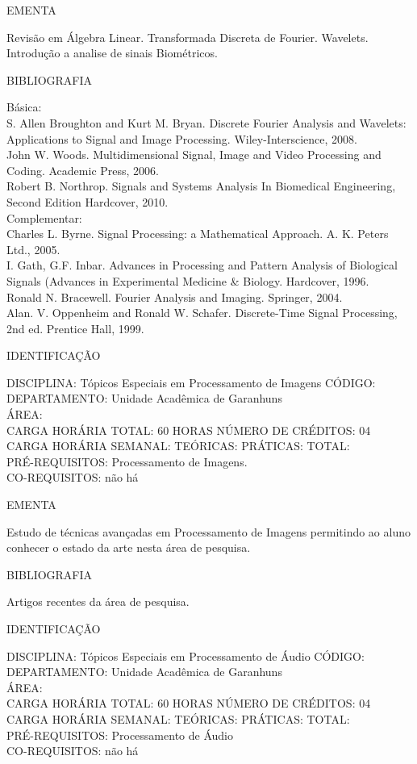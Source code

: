 \documentclass[
	12pt,				%
	openright,			%
  oneside,     %
	a4paper,			%
	chapter=TITLE,		%
	english,			%
	french,				%
	spanish,			%
	brazil				%
	]{abntex2}
\begin{document}
\begin{apendicesenv}
EMENTA 

Revisão em Álgebra Linear. Transformada Discreta de Fourier. Wavelets.
Introdução a analise de sinais Biométricos. 

BIBLIOGRAFIA 

Básica:\\
S. Allen Broughton and Kurt M. Bryan. Discrete Fourier Analysis and
Wavelets: Applications to Signal and Image Processing.
Wiley-Interscience, 2008.\\
John W. Woods. Multidimensional Signal, Image and Video Processing and
Coding. Academic Press, 2006.\\
Robert B. Northrop. Signals and Systems Analysis In Biomedical
Engineering, Second Edition  Hardcover, 2010.\\
Complementar:\\
Charles L. Byrne. Signal Processing: a Mathematical Approach. A. K.
Peters Ltd., 2005.\\
I. Gath, G.F. Inbar. Advances in Processing and Pattern Analysis of
Biological Signals (Advances in Experimental Medicine \& Biology.
Hardcover, 1996.\\
Ronald N. Bracewell. Fourier Analysis and Imaging. Springer, 2004.\\
Alan. V. Oppenheim and Ronald W. Schafer. Discrete-Time Signal
Processing, 2nd ed. Prentice Hall, 1999.

\newpage IDENTIFICAÇÃO

DISCIPLINA: Tópicos Especiais em Processamento de Imagens CÓDIGO:\\ 
DEPARTAMENTO: Unidade Acadêmica de Garanhuns\\ 
ÁREA: \\
CARGA HORÁRIA TOTAL: 60 HORAS NÚMERO DE CRÉDITOS: 04\\
CARGA HORÁRIA SEMANAL: TEÓRICAS: PRÁTICAS: TOTAL: \\
PRÉ-REQUISITOS: Processamento de Imagens.\\
CO-REQUISITOS: não há

EMENTA 

Estudo de técnicas avançadas em Processamento de Imagens permitindo ao
aluno conhecer o estado da arte nesta área de pesquisa.

BIBLIOGRAFIA 

Artigos recentes da área de pesquisa.

\newpage IDENTIFICAÇÃO

DISCIPLINA: Tópicos Especiais em Processamento de Áudio CÓDIGO:\\ 
DEPARTAMENTO: Unidade Acadêmica de Garanhuns\\ 
ÁREA: \\
CARGA HORÁRIA TOTAL: 60 HORAS NÚMERO DE CRÉDITOS: 04\\
CARGA HORÁRIA SEMANAL: TEÓRICAS: PRÁTICAS: TOTAL: \\
PRÉ-REQUISITOS: Processamento de Áudio\\
CO-REQUISITOS: não há


\end{apendicesenv}
\end{document}
